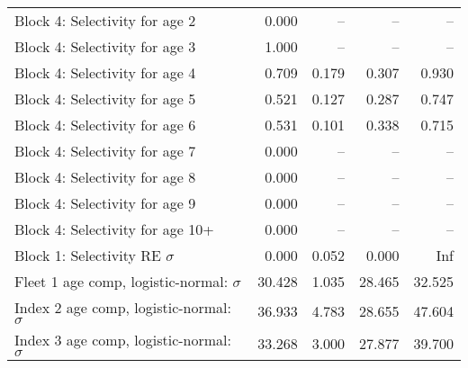 \documentclass[
]{article}
\begin{document}
\begin{landscape}
\begin{longtable}[t]{lrrrr}
Block 4: Selectivity for age 2 & 0.000 & -- & -- & --\\
Block 4: Selectivity for age 3 & 1.000 & -- & -- & --\\
Block 4: Selectivity for age 4 & 0.709 & 0.179 & 0.307 & 0.930\\
Block 4: Selectivity for age 5 & 0.521 & 0.127 & 0.287 & 0.747\\
\addlinespace
Block 4: Selectivity for age 6 & 0.531 & 0.101 & 0.338 & 0.715\\
Block 4: Selectivity for age 7 & 0.000 & -- & -- & --\\
Block 4: Selectivity for age 8 & 0.000 & -- & -- & --\\
Block 4: Selectivity for age 9 & 0.000 & -- & -- & --\\
Block 4: Selectivity for age 10+ & 0.000 & -- & -- & --\\
\addlinespace
Block 1: Selectivity RE $\sigma$ & 0.000 & 0.052 & 0.000 & Inf\\
Fleet 1 age comp, logistic-normal: $\sigma$ & 30.428 & 1.035 & 28.465 & 32.525\\
Index 2 age comp, logistic-normal: $\sigma$ & 36.933 & 4.783 & 28.655 & 47.604\\
Index 3 age comp, logistic-normal: $\sigma$ & 33.268 & 3.000 & 27.877 & 39.700\\*
\end{longtable}
\end{landscape}
\end{document}
